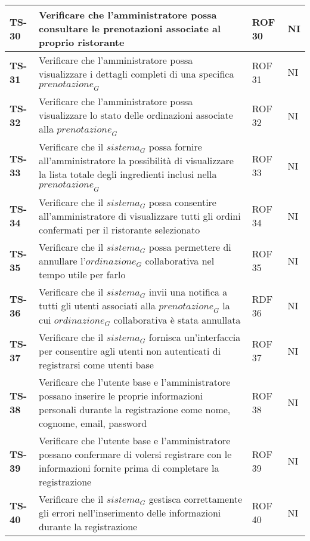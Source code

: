 \begin{longtable}{|>{\centering\arraybackslash}p{1.5cm}|p{12cm}|p{2cm}|p{1cm}|}
  \hline
  \rowcolor{gray!10}
  \textbf{TS-30} & Verificare che l'amministratore possa consultare le prenotazioni associate al proprio ristorante & ROF 30 & NI \\ 
  \hline
  \rowcolor{gray!10}
  \textbf{TS-31} & Verificare che l'amministratore possa visualizzare i dettagli completi di una specifica $\textit{prenotazione}_G$ & ROF 31 & NI \\ 
  \hline
  \rowcolor{gray!10}
  \textbf{TS-32} & Verificare che l'amministratore possa visualizzare lo stato delle ordinazioni associate alla $\textit{prenotazione}_G$ & ROF 32 & NI \\ 
  \hline
  \rowcolor{gray!10}
  \textbf{TS-33} & Verificare che il $\textit{sistema}_G$ possa fornire all'amministratore la possibilità di visualizzare la lista totale degli ingredienti inclusi nella $\textit{prenotazione}_G$ & ROF 33 & NI \\ 
  \hline
  \rowcolor{gray!10}
  \textbf{TS-34} & Verificare che il $\textit{sistema}_G$ possa consentire all'amministratore di visualizzare tutti gli ordini confermati per il ristorante selezionato & ROF 34 & NI \\ 
  \hline
  \rowcolor{gray!10}
  \textbf{TS-35} & Verificare che il $\textit{sistema}_G$ possa permettere di annullare l'$\textit{ordinazione}_G$ collaborativa nel tempo utile per farlo & ROF 35 & NI \\
  \hline
  \rowcolor{gray!10}
  \textbf{TS-36} & Verificare che il $\textit{sistema}_G$ invii una notifica a tutti gli utenti associati alla $\textit{prenotazione}_G$ la cui $\textit{ordinazione}_G$ collaborativa è stata annullata & RDF 36 & NI \\ 
  \hline
  \rowcolor{gray!10}
  \textbf{TS-37} & Verificare che il $\textit{sistema}_G$ fornisca un'interfaccia per consentire agli utenti non autenticati di registrarsi come utenti base & ROF 37 & NI \\ 
  \hline
  \rowcolor{gray!10}
  \textbf{TS-38} & Verificare che l'utente base e l'amministratore possano inserire le proprie informazioni personali durante la registrazione come nome, cognome, email, password & ROF 38 & NI \\
  \hline
  \rowcolor{gray!10}
  \textbf{TS-39} & Verificare che l'utente base e l'amministratore possano confermare di volersi registrare con le informazioni fornite prima di completare la registrazione & ROF 39 & NI \\ 
  \hline
  \rowcolor{gray!10}
  \textbf{TS-40} & Verificare che il $\textit{sistema}_G$ gestisca correttamente gli errori nell'inserimento delle informazioni durante la registrazione & ROF 40 & NI \\ 

\end{longtable}
